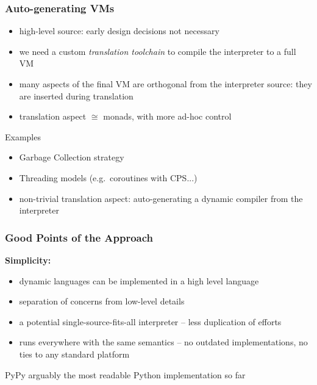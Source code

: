 \documentclass[utf8x]{beamer}
\begin{document}
\begin{frame}
  \frametitle{Auto-generating VMs}
  \begin{itemize}
  \item
    high-level source: early design decisions not necessary
  \item
    we need a custom \emph{translation toolchain} to compile the interpreter
    to a full VM
  \item
    many aspects of the final VM are orthogonal from the interpreter source:
    they are inserted during translation
  \item
    translation aspect $\cong$ monads, with more ad-hoc control
  \end{itemize}
  \pause
  \begin{block}{
    Examples}
    \begin{itemize}
    \item
      Garbage Collection strategy
    \item
      Threading models (e.g.\ coroutines with CPS...)
    \item
      non-trivial translation aspect: auto-generating a dynamic compiler from
      the interpreter
    \end{itemize}
  \end{block}
\end{frame}

\begin{frame}
  \frametitle{Good Points of the Approach}
  {\bf Simplicity:}

  \begin{itemize}
  \item
    dynamic languages can be implemented in a high level language
  \item
    separation of concerns from low-level details
  \item
    a potential single-source-fits-all interpreter --
    less duplication of efforts
  \item
    runs everywhere with the same semantics --
    no outdated implementations, no ties to any standard platform
  \end{itemize}
  \pause
  \begin{block}{PyPy}
     arguably the most readable Python implementation so far
  \end{block}
\end{frame}
\end{document}
